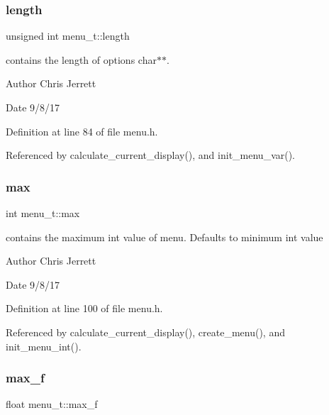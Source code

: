 \subsubsection{\texorpdfstring{length}{length}}
{\footnotesize\ttfamily unsigned int menu\+\_\+t\+::length}



contains the length of options char$\ast$$\ast$. 

\begin{DoxyAuthor}{Author}
Chris Jerrett 
\end{DoxyAuthor}
\begin{DoxyDate}{Date}
9/8/17 
\end{DoxyDate}


Definition at line 84 of file menu.\+h.



Referenced by calculate\+\_\+current\+\_\+display(), and init\+\_\+menu\+\_\+var().

\mbox{\label{structmenu__t_ace9cbaecd7bf311be0ef230da657f406}} 
\subsubsection{\texorpdfstring{max}{max}}
{\footnotesize\ttfamily int menu\+\_\+t\+::max}



contains the maximum int value of menu. Defaults to minimum int value 

\begin{DoxyAuthor}{Author}
Chris Jerrett 
\end{DoxyAuthor}
\begin{DoxyDate}{Date}
9/8/17 
\end{DoxyDate}


Definition at line 100 of file menu.\+h.



Referenced by calculate\+\_\+current\+\_\+display(), create\+\_\+menu(), and init\+\_\+menu\+\_\+int().

\mbox{\label{structmenu__t_a14b11d0a7610484462c8a6e93068a2c1}} 
\subsubsection{\texorpdfstring{max\+\_\+f}{max\_f}}
{\footnotesize\ttfamily float menu\+\_\+t\+::max\+\_\+f}



